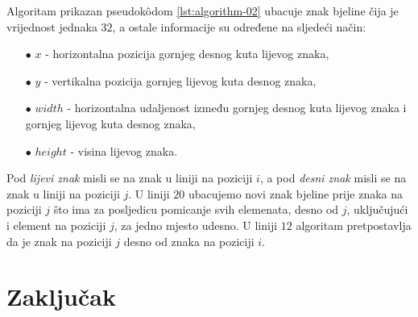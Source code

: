 \documentclass[times, utf8, zavrsni]{fer}
\begin{document}
Algoritam prikazan pseudokôdom \ref{lst:algorithm-02} ubacuje znak bjeline
čija je vrijednost jednaka $32$, a ostale informacije su određene na sljedeći
način:
\begin{itemize}
    \item[$\bullet$] $x$ - horizontalna pozicija gornjeg desnog kuta lijevog
                           znaka,
    \item[$\bullet$] $y$ - vertikalna pozicija gornjeg lijevog kuta desnog
                           znaka,
    \item[$\bullet$] $width$ - horizontalna udaljenost između gornjeg desnog
                               kuta lijevog znaka i gornjeg lijevog kuta desnog
                               znaka,
    \item[$\bullet$] $height$ - visina lijevog znaka.
\end{itemize}

Pod \emph{lijevi znak} misli se na znak u liniji na poziciji $i$, a pod
\emph{desni znak} misli se na znak u liniji na poziciji $j$. U liniji $20$
ubacujemo novi znak bjeline prije znaka na poziciji $j$ što
ima za posljedicu pomicanje svih elemenata, desno od $j$, uključujući i element
na poziciji $j$, za jedno mjesto udesno. U liniji $12$ algoritam pretpostavlja
da je znak na poziciji $j$ desno od znaka na poziciji $i$.
















\chapter{Zaključak}




\begin{sazetak}

\kljucnerijeci{}
\end{sazetak}

\begin{abstract}

\keywords{}
\end{abstract}
\end{document}
